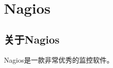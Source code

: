 \section{Nagios}
\label{sec:Nagios}

\subsection{关于Nagios}
\label{subsec:AboutNagios}

Nagios是一款非常优秀的监控软件。
